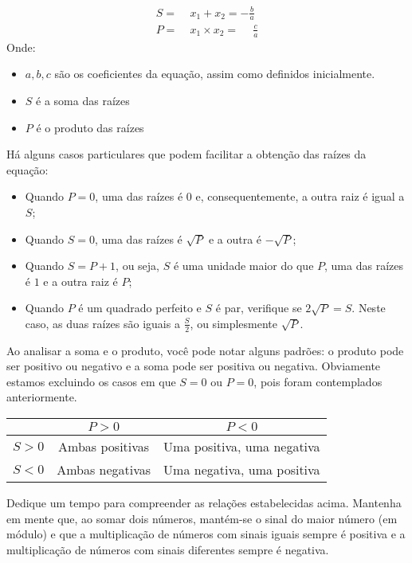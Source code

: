 \documentclass[12pt]{report}
\newcommand{\1}{\faThermometerEmpty}
\newcommand{\2}{\faThermometerQuarter}
\newcommand{\3}{\faThermometerHalf}
\newcommand{\4}{\faThermometerThreeQuarters}
\newcommand{\5}{\faThermometerFull}
\begin{document}
$$\begin{aligned}
    S =& \; x_1 + x_2 = -\frac{b}{a}  \\
    P =& \; x_1 \times x_2 = \phantom{-} \frac{c}{a}
\end{aligned}$$
Onde:
\begin{itemize}
    \item $a,b,c$ são os coeficientes da equação, assim como definidos inicialmente.
    \item $S$ é a soma das raízes
    \item $P$ é o produto das raízes
\end{itemize}

Há alguns casos particulares que podem facilitar a obtenção das raízes da equação:
\begin{itemize}
    \item Quando $P=0$, uma das raízes é $0$ e, consequentemente, a outra raiz é igual a $S$;
    \item Quando $S=0$, uma das raízes é $\sqrt{P}$ e a outra é $-\sqrt{P}$;
    \item Quando $S = P+1$, ou seja, $S$ é uma unidade maior do que $P$, uma das raízes é $1$ e a outra raiz é $P$;
    \item Quando $P$ é um quadrado perfeito e $S$ é par, verifique se $2\sqrt{P} =S$. Neste caso, as duas raízes são iguais a $\frac{S}{2}$, ou simplesmente $\sqrt{P}$.
\end{itemize}

Ao analisar a soma e o produto, você pode notar alguns padrões: o produto pode ser positivo ou negativo e a soma pode ser positiva ou negativa. Obviamente estamos excluindo os casos em que $S=0$ ou $P=0$, pois foram contemplados anteriormente.

\begin{center}
\begin{tabular}{|c|c|c|}
\hline
 & $P > 0$ & $P < 0$ \\
\hline
$S > 0$ & Ambas positivas & Uma positiva, uma negativa \\
\hline
$S < 0$ & Ambas negativas & Uma negativa, uma positiva \\
\hline
\end{tabular}
\end{center}


Dedique um tempo para compreender as relações estabelecidas acima. Mantenha em mente que, ao somar dois números, mantém-se o sinal do maior número (em módulo) e que a multiplicação de números com sinais iguais sempre é positiva e a multiplicação de números com sinais diferentes sempre é negativa.
\end{document}
